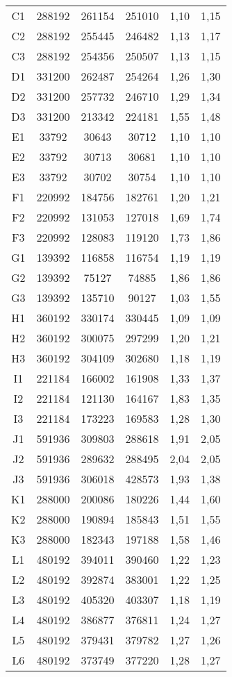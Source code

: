 \begin{center}
\begin{longtable}{cccccc}
    C1    & 288192 & 261154 & 251010 & 1,10  & 1,15 \\
    C2    & 288192 & 255445 & 246482 & 1,13  & 1,17 \\
    C3    & 288192 & 254356 & 250507 & 1,13  & 1,15 \\
    D1    & 331200 & 262487 & 254264 & 1,26  & 1,30 \\
    D2    & 331200 & 257732 & 246710 & 1,29  & 1,34 \\
    D3    & 331200 & 213342 & 224181 & 1,55  & 1,48 \\
    E1    & 33792 & 30643 & 30712 & 1,10  & 1,10 \\
    E2    & 33792 & 30713 & 30681 & 1,10  & 1,10 \\
    E3    & 33792 & 30702 & 30754 & 1,10  & 1,10 \\
    F1    & 220992 & 184756 & 182761 & 1,20  & 1,21 \\
    F2    & 220992 & 131053 & 127018 & 1,69  & 1,74 \\
    F3    & 220992 & 128083 & 119120 & 1,73  & 1,86 \\
    G1    & 139392 & 116858 & 116754 & 1,19  & 1,19 \\
    G2    & 139392 & 75127 & 74885 & 1,86  & 1,86 \\
    G3    & 139392 & 135710 & 90127 & 1,03  & 1,55 \\
    H1    & 360192 & 330174 & 330445 & 1,09  & 1,09 \\
    H2    & 360192 & 300075 & 297299 & 1,20  & 1,21 \\
    H3    & 360192 & 304109 & 302680 & 1,18  & 1,19 \\
    I1    & 221184 & 166002 & 161908 & 1,33  & 1,37 \\
    I2    & 221184 & 121130 & 164167 & 1,83  & 1,35 \\
    I3    & 221184 & 173223 & 169583 & 1,28  & 1,30 \\
    J1    & 591936 & 309803 & 288618 & 1,91  & 2,05 \\
    J2    & 591936 & 289632 & 288495 & 2,04  & 2,05 \\
    J3    & 591936 & 306018 & 428573 & 1,93  & 1,38 \\
    K1    & 288000 & 200086 & 180226 & 1,44  & 1,60 \\
    K2    & 288000 & 190894 & 185843 & 1,51  & 1,55 \\
    K3    & 288000 & 182343 & 197188 & 1,58  & 1,46 \\
    L1    & 480192 & 394011 & 390460 & 1,22  & 1,23 \\
    L2    & 480192 & 392874 & 383001 & 1,22  & 1,25 \\
    L3    & 480192 & 405320 & 403307 & 1,18  & 1,19 \\
    L4    & 480192 & 386877 & 376811 & 1,24  & 1,27 \\
    L5    & 480192 & 379431 & 379782 & 1,27  & 1,26 \\
    L6    & 480192 & 373749 & 377220 & 1,28  & 1,27 \\
\end{longtable}
\end{center}

